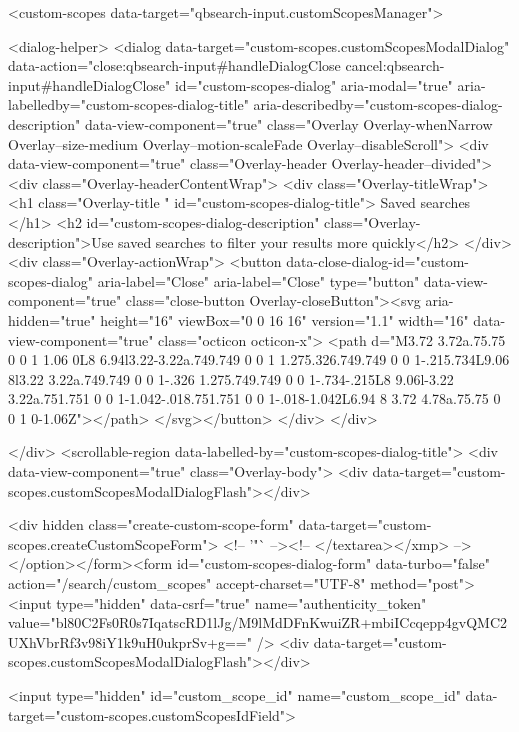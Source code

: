     <custom-scopes data-target="qbsearch-input.customScopesManager">
    
<dialog-helper>
  <dialog data-target="custom-scopes.customScopesModalDialog" data-action="close:qbsearch-input#handleDialogClose cancel:qbsearch-input#handleDialogClose" id="custom-scopes-dialog" aria-modal="true" aria-labelledby="custom-scopes-dialog-title" aria-describedby="custom-scopes-dialog-description" data-view-component="true" class="Overlay Overlay-whenNarrow Overlay--size-medium Overlay--motion-scaleFade Overlay--disableScroll">
    <div data-view-component="true" class="Overlay-header Overlay-header--divided">
  <div class="Overlay-headerContentWrap">
    <div class="Overlay-titleWrap">
      <h1 class="Overlay-title " id="custom-scopes-dialog-title">
        Saved searches
      </h1>
        <h2 id="custom-scopes-dialog-description" class="Overlay-description">Use saved searches to filter your results more quickly</h2>
    </div>
    <div class="Overlay-actionWrap">
      <button data-close-dialog-id="custom-scopes-dialog" aria-label="Close" aria-label="Close" type="button" data-view-component="true" class="close-button Overlay-closeButton"><svg aria-hidden="true" height="16" viewBox="0 0 16 16" version="1.1" width="16" data-view-component="true" class="octicon octicon-x">
    <path d="M3.72 3.72a.75.75 0 0 1 1.06 0L8 6.94l3.22-3.22a.749.749 0 0 1 1.275.326.749.749 0 0 1-.215.734L9.06 8l3.22 3.22a.749.749 0 0 1-.326 1.275.749.749 0 0 1-.734-.215L8 9.06l-3.22 3.22a.751.751 0 0 1-1.042-.018.751.751 0 0 1-.018-1.042L6.94 8 3.72 4.78a.75.75 0 0 1 0-1.06Z"></path>
</svg></button>
    </div>
  </div>
  
</div>
      <scrollable-region data-labelled-by="custom-scopes-dialog-title">
        <div data-view-component="true" class="Overlay-body">        <div data-target="custom-scopes.customScopesModalDialogFlash"></div>

        <div hidden class="create-custom-scope-form" data-target="custom-scopes.createCustomScopeForm">
        <!-- '"` --><!-- </textarea></xmp> --></option></form><form id="custom-scopes-dialog-form" data-turbo="false" action="/search/custom_scopes" accept-charset="UTF-8" method="post"><input type="hidden" data-csrf="true" name="authenticity_token" value="bl80C2Fs0R0s7IqatscRD1lJg/M9lMdDFnKwuiZR+mbiICcqepp4gvQMC2UXhVbrRf3v98iY1k9uH0ukprSv+g==" />
          <div data-target="custom-scopes.customScopesModalDialogFlash"></div>

          <input type="hidden" id="custom_scope_id" name="custom_scope_id" data-target="custom-scopes.customScopesIdField">

